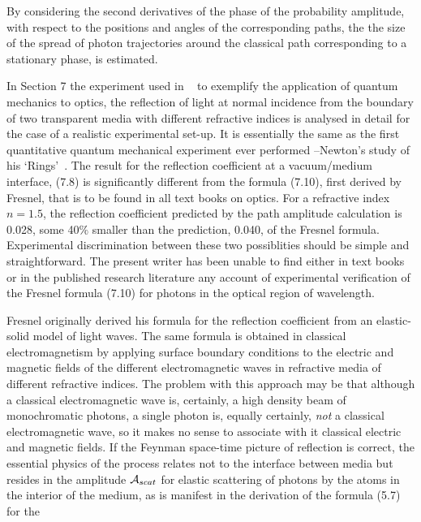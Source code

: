 \documentclass [12pt]{article}
\begin{document}
{ By considering the second 
   derivatives of the phase of the probability amplitude, with respect to the positions
  and angles of the corresponding paths, the the size of the spread of photon trajectories
   around the classical path corresponding to a stationary phase, is estimated.
   \par In Section 7 the experiment used in ~\cite{Feyn1} to exemplify the application
  of quantum mechanics to optics, the reflection of light at normal incidence from the boundary
  of two transparent media with different refractive indices is analysed in detail for the 
  case of a realistic experimental set-up. It is essentially the same as the first 
   quantitative quantum mechanical experiment ever performed --Newton's
   study of his `Rings'~\cite{Newton}. The result for the reflection coefficient at a vacuum/medium
   interface, (7.8) is significantly different from the formula (7.10), first derived by Fresnel, that
   is to be found in all text books on optics. For a refractive index $n= 1.5$, the reflection
   coefficient predicted by the path amplitude calculation is 0.028, some 40$\%$ smaller than the
    prediction, 0.040, of the Fresnel formula. Experimental discrimination between these two possiblities
    should be simple and straightforward. The present writer has been unable to find either in
    text books or in the published research literature any account of experimental verification of the
    Fresnel formula (7.10) for photons in the optical region of wavelength.
     \par Fresnel originally derived his formula for the reflection coefficient from
    an elastic-solid model of light waves. The same formula is obtained in 
    classical electromagnetism by applying surface
    boundary conditions to the electric and magnetic fields of the different electromagnetic waves
     in refractive
    media of different refractive indices. The problem with this approach may be that
   although a classical electromagnetic wave is, certainly, a high density beam of
    monochromatic photons, a single photon is, equally certainly, {\it not} a classical
   electromagnetic wave, so it makes no sense to associate with it classical
  electric and magnetic fields. If the Feynman space-time picture of reflection is correct,
   the essential physics of the process relates not to the interface
   between media but resides in the amplitude ${\cal A}_{scat}$ for elastic scattering of
   photons by the atoms in the interior of the medium, as is manifest in the derivation
   of the  formula (5.7) for the
}
\end{document}
